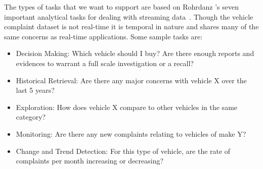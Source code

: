 The types of tasks that we want to support are based on Rohrdanz \etal's seven
important analytical tasks for dealing with streaming data~\cite{ROH2011a}. 
Though the vehicle complaint dataset is not real-time it is temporal in nature
and shares many of the same concerns as real-time applications. Some sample 
tasks are:

\begin{itemize}[noitemsep]
   \item Decision Making: Which vehicle should I buy? Are there enough
   reports and evidences to warrant a full scale investigation or a recall?
   \item Historical Retrieval: Are there any major concerns with vehicle X over the last 5 years?
   \item Exploration: How does vehicle X compare to other vehicles in the same category?
   \item Monitoring: Are there any new complaints relating to vehicles of make Y?
   \item Change and Trend Detection: For this type of vehicle, are the rate of complaints per month increasing or decreasing?
\end{itemize}
